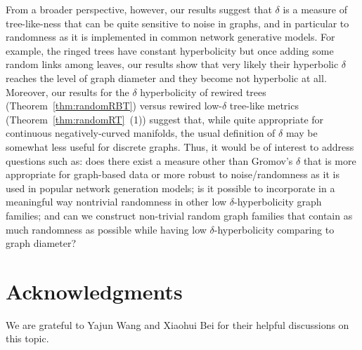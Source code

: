 \documentclass[11pt]{article}
\begin{document}
From a broader perspective, however, our results suggest that $\delta$ is a 
measure of tree-like-ness that can be quite sensitive to noise in graphs, 
and in particular to randomness as it is implemented in common network 
generative models.  
For example, the ringed trees have constant hyperbolicity but once adding some random links
	among leaves, our results show that very likely their hyperbolic $\delta$ 
	reaches the level of graph diameter and they become	not hyperbolic at all.
Moreover, our results for the $\delta$ hyperbolicity of rewired trees 
(Theorem~\ref{thm:randomRBT})
versus 
rewired low-$\delta$ tree-like metrics 
(Theorem~\ref{thm:randomRT}~(1)) suggest that, while quite appropriate 
for continuous negatively-curved manifolds, the usual definition of $\delta$ 
may be somewhat less useful for discrete graphs.  
Thus, it would be of interest to address questions such as: does there exist 
a measure other than Gromov's $\delta$ that is more appropriate for 
graph-based data or more robust to noise/randomness as it is used in popular 
network generation models; is it possible to incorporate in a meaningful way 
nontrivial randomness in other low $\delta$-hyperbolicity graph families; and can 
we construct non-trivial random graph families that contain as much randomness as possible while
having low $\delta$-hyperbolicity comparing to graph diameter?


\section*{Acknowledgments}

We are grateful to Yajun Wang and
	Xiaohui Bei for their helpful discussions on this topic.






%


\end{document}
